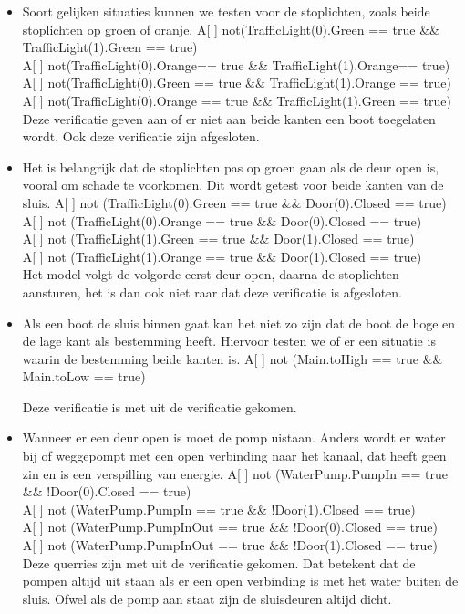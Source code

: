 \documentclass{article}
\begin{document}
\begin{itemize}
\item Soort gelijken situaties kunnen we testen voor de stoplichten, zoals beide stoplichten op groen of oranje.
{\center
A[ ] not(TrafficLight(0).Green == true \&\& TrafficLight(1).Green == true)\\
A[ ] not(TrafficLight(0).Orange== true \&\& TrafficLight(1).Orange== true)\\

A[ ] not(TrafficLight(0).Green == true \&\& TrafficLight(1).Orange == true)\\
A[ ] not(TrafficLight(0).Orange == true \&\& TrafficLight(1).Green == true)\\
}
\vskip0.3cm
Deze verificatie geven aan of er niet aan beide kanten een boot toegelaten wordt. Ook deze verificatie zijn {\color{green}{groen}} afgesloten.


\item Het is belangrijk dat de stoplichten pas op groen gaan als de deur open is, vooral om schade te voorkomen. Dit wordt getest voor beide kanten van de sluis.
{\center
A[ ] not (TrafficLight(0).Green == true \&\& Door(0).Closed == true)\\
A[ ] not (TrafficLight(0).Orange == true \&\& Door(0).Closed == true)\\
\vskip0.1cm
A[ ] not (TrafficLight(1).Green == true \&\& Door(1).Closed == true)\\
A[ ] not (TrafficLight(1).Orange == true \&\& Door(1).Closed == true)\\
}
Het model volgt de volgorde eerst deur open, daarna de stoplichten aansturen, het is dan ook niet raar dat deze verificatie {\color{green}{groen}} is afgesloten.


\item Als een boot de sluis binnen gaat kan het niet zo zijn dat de boot de hoge en de lage kant als bestemming heeft. Hiervoor testen we of er een situatie is waarin de bestemming beide kanten is.
{\center
A[ ] not (Main.toHigh == true \&\& Main.toLow == true)\\
}


Deze verificatie is met {\color{green}{groen}} uit de verificatie gekomen.


\item Wanneer er een deur open is moet de pomp uistaan. Anders wordt er water bij of weggepompt met een open verbinding naar het kanaal, dat heeft geen zin en is een verspilling van energie.
{\center
A[ ] not (WaterPump.PumpIn == true \&\& !Door(0).Closed == true)\\
A[ ] not (WaterPump.PumpIn == true \&\& !Door(1).Closed == true)\\
\vskip0.1cm
A[ ] not (WaterPump.PumpInOut == true \&\& !Door(0).Closed == true)\\
A[ ] not (WaterPump.PumpInOut == true \&\& !Door(1).Closed == true)\\
}
Deze querries zijn met {\color{green}{groen}} uit de verificatie gekomen. Dat betekent dat de pompen altijd uit staan als er een open verbinding is met het water buiten de sluis. Ofwel als de pomp aan staat zijn de sluisdeuren altijd dicht.


\end{itemize}
\end{document}

